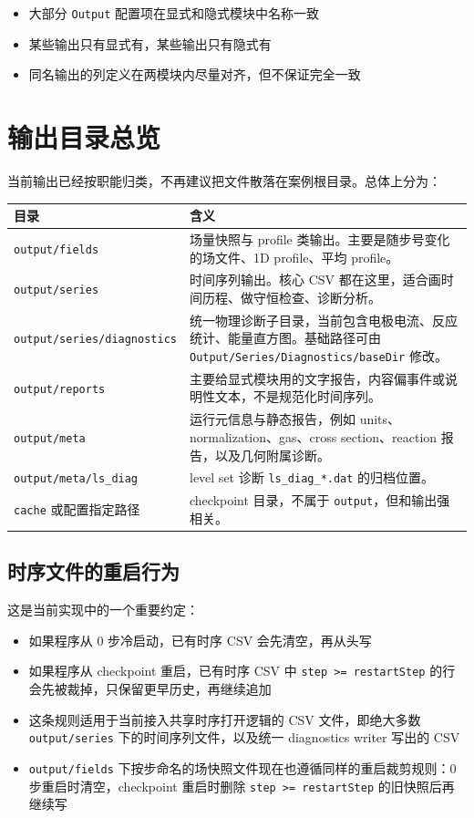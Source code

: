\documentclass[11pt,a4paper]{ctexart}
\newcommand{\code}[1]{\texttt{#1}}
\newcommand{\dir}[1]{\texttt{#1}}
\begin{document}
\begin{itemize}
  \item 大部分 \code{Output} 配置项在显式和隐式模块中名称一致
  \item 某些输出只有显式有，某些输出只有隐式有
  \item 同名输出的列定义在两模块内尽量对齐，但不保证完全一致
\end{itemize}

\section{输出目录总览}

当前输出已经按职能归类，不再建议把文件散落在案例根目录。总体上分为：

\begin{longtable}{p{}p{}}
\toprule
目录 & 含义 \\
\midrule
\endhead
\dir{output/fields} & 场量快照与 profile 类输出。主要是随步号变化的场文件、1D profile、平均 profile。 \\
\dir{output/series} & 时间序列输出。核心 CSV 都在这里，适合画时间历程、做守恒检查、诊断分析。 \\
\dir{output/series/diagnostics} & 统一物理诊断子目录，当前包含电极电流、反应统计、能量直方图。基础路径可由 \code{Output/Series/Diagnostics/baseDir} 修改。 \\
\dir{output/reports} & 主要给显式模块用的文字报告，内容偏事件或说明性文本，不是规范化时间序列。 \\
\dir{output/meta} & 运行元信息与静态报告，例如 units、normalization、gas、cross section、reaction 报告，以及几何附属诊断。 \\
\dir{output/meta/ls\_diag} & level set 诊断 \code{ls\_diag\_*.dat} 的归档位置。 \\
\dir{cache} 或配置指定路径 & checkpoint 目录，不属于 \dir{output}，但和输出强相关。 \\
\bottomrule
\end{longtable}

\subsection{时序文件的重启行为}

这是当前实现中的一个重要约定：

\begin{itemize}
  \item 如果程序从 0 步冷启动，已有时序 CSV 会先清空，再从头写
  \item 如果程序从 checkpoint 重启，已有时序 CSV 中 \code{step >= restartStep} 的行会先被裁掉，只保留更早历史，再继续追加
  \item 这条规则适用于当前接入共享时序打开逻辑的 CSV 文件，即绝大多数 \dir{output/series} 下的时间序列文件，以及统一 diagnostics writer 写出的 CSV
  \item \dir{output/fields} 下按步命名的场快照文件现在也遵循同样的重启裁剪规则：0 步重启时清空，checkpoint 重启时删除 \code{step >= restartStep} 的旧快照后再继续写
\end{itemize}
\end{document}
